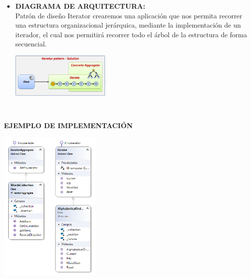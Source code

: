 \documentclass[twoside,twocolumn]{article}
\begin{document}
        \begin{itemize}
        \item \textbf{DIAGRAMA DE ARQUITECTURA:}	\\
        Patrón de diseño Iterator crearemos una aplicación que nos permita recorrer una estructura organizacional jerárquica, mediante la implementación de un iterador, el cual nos permitirá recorrer todo el árbol de la estructura de forma secuencial.
        \begin{center}
            \includegraphics[width=5cm]{./img/Imagen11.png} 
        \end{center}
        \\

        \end{itemize} 

    \item \textbf{EJEMPLO DE IMPLEMENTACIÓN}
    \begin{center}
        \includegraphics[width=5cm]{./img/imagen12.png} 
    \end{center}
	
\end{document}

